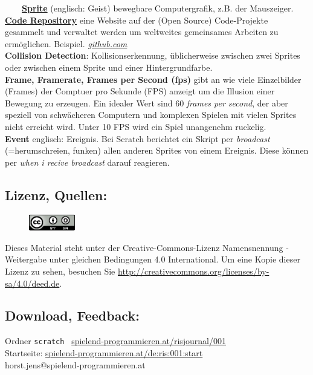 ~~~~\href{https://de.wikipedia.org/wiki/Sprite_(Computergrafik)}{\textbf{Sprite}} (englisch: Geist) bewegbare Computergrafik, z.B. der Mauszeiger.\\

\href{https://en.wikipedia.org/wiki/Source_code_repository}{\textbf{Code Repository}} eine Website auf der (Open Source) Code-Projekte gesammelt und verwaltet werden um weltweites gemeinsames Arbeiten zu ermöglichen. Beispiel. \href{http://github.com}{\textit{github.com}}\\

\textbf{Collision Detection}: Kollisionserkennung, üblicherweise zwischen zwei Sprites oder zwischen einem Sprite und einer Hintergrundfarbe. \\

\textbf{Frame, Framerate, Frames per Second (fps)} gibt an wie viele Einzelbilder (Frames) der Comptuer pro Sekunde (FPS) anzeigt um die Illusion einer Bewegung zu erzeugen. Ein idealer Wert sind 60 \textit{frames per second}, der aber speziell von schwächeren Computern und komplexen Spielen mit vielen Sprites nicht erreicht wird. Unter 10 FPS wird ein Spiel unangenehm ruckelig. \\

\textbf{Event} englisch: Ereignis. Bei Scratch berichtet ein Skript per \textit{broadcast} (=herumschreien, funken) allen anderen Sprites von einem Ereignis. Diese können per \textit{when i recive broadcast} darauf reagieren. \\


\subsection*{Lizenz, Quellen:}
\begin{figure}
\includegraphics[width=2cm]{powdertoytutorial/ccbysa88x31.png}
\end{figure}
Dieses Material steht unter der Creative-Commons-Lizenz Namensnennung - Weitergabe unter gleichen Bedingungen 4.0 International. Um eine Kopie dieser Lizenz zu sehen, besuchen Sie \url{http://creativecommons.org/licenses/by-sa/4.0/deed.de}.

\subsection*{Download, Feedback:}
\footnotesize{
Ordner \texttt{scratch} \Mundus\ \href{http://spielend-programmieren.at/risjournal/001}{spielend-programmieren.at/risjournal/001}\\
Startseite: \href{http://spielend-programmieren.at/de:ris:001:start}{spielend-programmieren.at/de:ris:001:start}\\ 
\Letter\:  horst.jens@spielend-programmieren.at \\}
\normalsize{}

